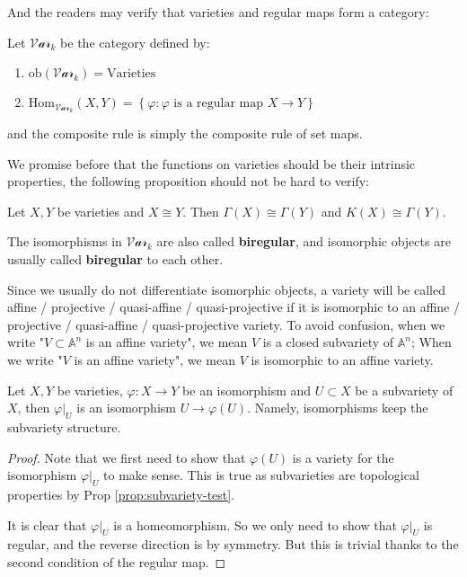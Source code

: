 \documentclass{note-eng}
\begin{document}
And the readers may verify that varieties and regular maps form a category:

\begin{definition}
    Let $\mathscr{Var}_k$ be the category defined by:
    \begin{enumerate}
        \item $\mathrm{ob}(\mathscr{Var}_k) = \text{Varieties}$
        \item $\mathrm{Hom}_{\mathscr{Var}_k}(X, Y) = \left\lbrace \varphi: \varphi \text{ is a regular map } X \rightarrow Y \right\rbrace$
    \end{enumerate}
    and the composite rule is simply the composite rule of set maps.
\end{definition}

We promise before that the functions on varieties should be their intrinsic properties, the following proposition should not be hard to verify:

\begin{proposition}
    Let $X, Y$ be varieties and $X \cong Y$. Then $\Gamma(X) \cong \Gamma(Y)$ and $K(X) \cong \Gamma(Y)$.
\end{proposition}

The isomorphisms in $\mathscr{Var}_k$ are also called \textbf{biregular}, and isomorphic objects are usually called \textbf{biregular} to each other.

Since we usually do not differentiate isomorphic objects, a variety will be called affine / projective / quasi-affine / quasi-projective if it is isomorphic to an affine / projective / quasi-affine / quasi-projective variety. To avoid confusion, when we write "$V \subset \mathbb{A}^n$ is an affine variety", we mean $V$ is a closed subvariety of $\mathbb{A}^n$; When we write "$V$ is an affine variety", we mean $V$ is isomorphic to an affine variety.

\begin{lemma}\label{lem:iso-keep-substructure}
    Let $X, Y$ be varieties, $\varphi: X \rightarrow Y$ be an isomorphism and $U \subset X$ be a subvariety of $X$, then $\varphi|_U$ is an isomorphism $U \rightarrow \varphi(U)$. Namely, isomorphisms keep the subvariety structure.
\end{lemma}

\begin{proof}
    Note that we first need to show that $\varphi(U)$ is a variety for the isomorphism $\varphi|_U$ to make sense. This is true as subvarieties are topological properties by Prop \ref{prop:subvariety-test}.

    It is clear that $\varphi|_U$ is a homeomorphism. So we only need to show that $\varphi|_U$ is regular, and the reverse direction is by symmetry. But this is trivial thanks to the second condition of the regular map.
\end{proof}
\end{document}

